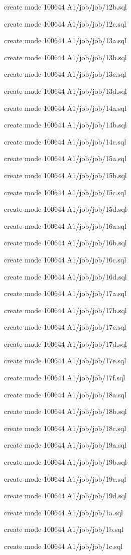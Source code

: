 \documentclass[11pt,a4paper]{article}
\begin{document}
{create mode 100644 A1/job/job/12b.sql

create mode 100644 A1/job/job/12c.sql

create mode 100644 A1/job/job/13a.sql

create mode 100644 A1/job/job/13b.sql

create mode 100644 A1/job/job/13c.sql

create mode 100644 A1/job/job/13d.sql

create mode 100644 A1/job/job/14a.sql

create mode 100644 A1/job/job/14b.sql

create mode 100644 A1/job/job/14c.sql

create mode 100644 A1/job/job/15a.sql

create mode 100644 A1/job/job/15b.sql

create mode 100644 A1/job/job/15c.sql

create mode 100644 A1/job/job/15d.sql

create mode 100644 A1/job/job/16a.sql

create mode 100644 A1/job/job/16b.sql

create mode 100644 A1/job/job/16c.sql

create mode 100644 A1/job/job/16d.sql

create mode 100644 A1/job/job/17a.sql

create mode 100644 A1/job/job/17b.sql

create mode 100644 A1/job/job/17c.sql

create mode 100644 A1/job/job/17d.sql

create mode 100644 A1/job/job/17e.sql

create mode 100644 A1/job/job/17f.sql

create mode 100644 A1/job/job/18a.sql

create mode 100644 A1/job/job/18b.sql

create mode 100644 A1/job/job/18c.sql

create mode 100644 A1/job/job/19a.sql

create mode 100644 A1/job/job/19b.sql

create mode 100644 A1/job/job/19c.sql

create mode 100644 A1/job/job/19d.sql

create mode 100644 A1/job/job/1a.sql

create mode 100644 A1/job/job/1b.sql

create mode 100644 A1/job/job/1c.sql

}
\end{document}
